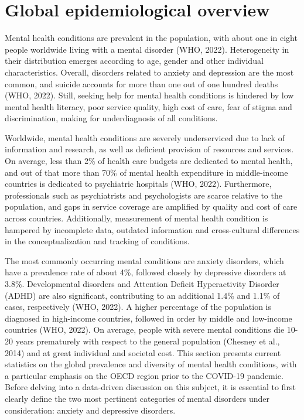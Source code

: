 \section{Global epidemiological overview}
    Mental health conditions are prevalent in the population, with about one in eight people worldwide living with a mental disorder (WHO, 2022). Heterogeneity in their distribution emerges according to age, gender and other individual characteristics. Overall, disorders related to anxiety and depression are the most common, and suicide accounts for more than one out of one hundred deaths (WHO, 2022). 
    Still, seeking help for mental health conditions is hindered by low mental health literacy, poor service quality, high cost of care, fear of stigma and discrimination, making for underdiagnosis of all conditions. 

    Worldwide, mental health conditions are severely underserviced due to lack of information and research, as well as deficient provision of resources and services. On average, less than 2\% of health care budgets are dedicated to mental health, and out of that more than 70\% of mental health expenditure in middle-income countries is dedicated to psychiatric hospitals (WHO, 2022). 
    Furthermore, professionals such as psychiatrists and psychologists are scarce relative to the population, and gaps in service coverage are amplified by quality and cost of care across countries. 
    Additionally, measurement of mental health condition is hampered by incomplete data, outdated information and cross-cultural differences in the conceptualization and tracking of conditions.

    The most commonly occurring mental conditions are anxiety disorders, which have a prevalence rate of about 4\%, followed closely by depressive disorders at 3.8\%. Developmental disorders and Attention Deficit Hyperactivity Disorder (ADHD) are also significant, contributing to an additional 1.4\% and 1.1\% of cases, respectively (WHO, 2022).
    A higher percentage of the population is diagnosed in high-income countries, followed in order by middle and low-income countries (WHO, 2022). On average, people with severe mental conditions die 10-20 years prematurely with respect to the general population (Chesney et al., 2014) and at great individual and societal cost. 
    This section presents current statistics on the global prevalence and diversity of mental health conditions, with a particular emphasis on the OECD region prior to the COVID-19 pandemic. Before delving into a data-driven discussion on this subject, it is essential to first clearly define the two most pertinent categories of mental disorders under consideration: anxiety and depressive disorders. 


